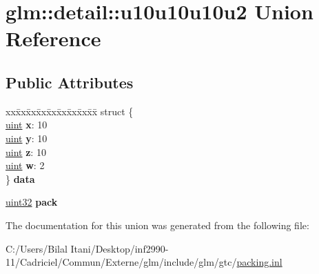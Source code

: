 \hypertarget{unionglm_1_1detail_1_1u10u10u10u2}{}\section{glm\+:\+:detail\+:\+:u10u10u10u2 Union Reference}
\label{unionglm_1_1detail_1_1u10u10u10u2}
\subsection*{Public Attributes}
\begin{DoxyCompactItemize}
\item 
\begin{tabbing}
xx\=xx\=xx\=xx\=xx\=xx\=xx\=xx\=xx\=\kill
struct \{\\
\>\hyperlink{group__core__precision_ga4fd29415871152bfb5abd588334147c8}{uint} {\bfseries x}: 10\\
\>\hyperlink{group__core__precision_ga4fd29415871152bfb5abd588334147c8}{uint} {\bfseries y}: 10\\
\>\hyperlink{group__core__precision_ga4fd29415871152bfb5abd588334147c8}{uint} {\bfseries z}: 10\\
\>\hyperlink{group__core__precision_ga4fd29415871152bfb5abd588334147c8}{uint} {\bfseries w}: 2\\
\} {\bfseries data}\hypertarget{unionglm_1_1detail_1_1u10u10u10u2_a2b1c07bb6d4d674dade5bd7c1e91c791}{}\label{unionglm_1_1detail_1_1u10u10u10u2_a2b1c07bb6d4d674dade5bd7c1e91c791}
\\

\end{tabbing}\item 
\hyperlink{group__gtc__type__precision_ga202b6a53c105fcb7e531f9b443518451}{uint32} {\bfseries pack}\hypertarget{unionglm_1_1detail_1_1u10u10u10u2_a8bb9d7804af09ba3790a4b5622321511}{}\label{unionglm_1_1detail_1_1u10u10u10u2_a8bb9d7804af09ba3790a4b5622321511}

\end{DoxyCompactItemize}


The documentation for this union was generated from the following file\+:\begin{DoxyCompactItemize}
\item 
C\+:/\+Users/\+Bilal Itani/\+Desktop/inf2990-\/11/\+Cadriciel/\+Commun/\+Externe/glm/include/glm/gtc/\hyperlink{packing_8inl}{packing.\+inl}\end{DoxyCompactItemize}
